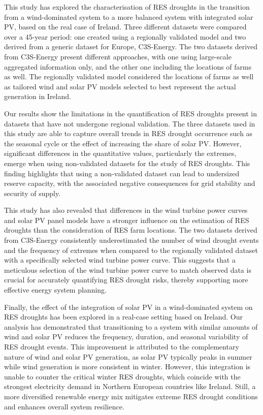 \documentclass[preprint, 12pt]{elsarticle}
\begin{document}
This study has explored the characterisation of RES droughts in the transition from a wind-dominated system to a more balanced system with integrated solar PV, based on the real case of Ireland. Three different datasets were compared over a 45-year period: one created using a regionally validated model and two derived from a generic dataset for Europe, C3S-Energy. The two datasets derived from C3S-Energy present different approaches, with one using large-scale aggregated information only, and the other one including the locations of farms as well. The regionally validated model considered the locations of farms as well as tailored wind and solar PV models selected to best represent the actual generation in Ireland.

Our results show the limitations in the quantification of RES droughts present in datasets that have not undergone regional validation. The three datasets used in this study are able to capture overall trends in RES drought occurrence such as the seasonal cycle or the effect of increasing the share of solar PV. However, significant differences in the quantitative values, particularly the extremes, emerge when using non-validated datasets for the study of RES droughts. This finding highlights that using a non-validated dataset can lead to undersized reserve capacity, with the associated negative consequences for grid stability and security of supply.

This study has also revealed that differences in the wind turbine power curves and solar PV panel models have a stronger influence on the estimation of RES droughts than the consideration of RES farm locations. The two datasets derived from C3S-Energy consistently underestimated the number of wind drought events and the frequency of extremes when compared to the regionally validated dataset with a specifically selected wind turbine power curve. This suggests that a meticulous selection of the wind turbine power curve to match observed data is crucial for accurately quantifying RES drought risks, thereby supporting more effective energy system planning.

Finally, the effect of the integration of solar PV in a wind-dominated system on RES droughts has been explored in a real-case setting based on Ireland. Our analysis has demonstrated that transitioning to a system with similar amounts of wind and solar PV reduces the frequency, duration, and seasonal variability of RES drought events. This improvement is attributed to the complementary nature of wind and solar PV generation, as solar PV typically peaks in summer while wind generation is more consistent in winter. However, this integration is unable to counter the critical winter RES droughts, which coincide with the strongest electricity demand in Northern European countries like Ireland. Still, a more diversified renewable energy mix mitigates extreme RES drought conditions and enhances overall system resilience.
\end{document}
